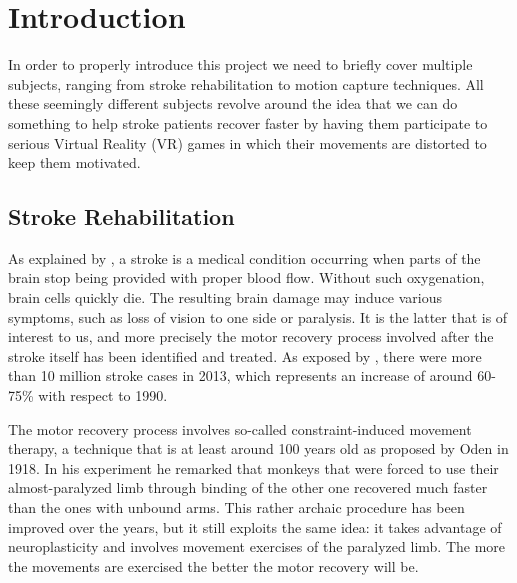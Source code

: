 
\chapter{Introduction} %

\label{Chapter1} %


In order to properly introduce this project we need to briefly cover multiple subjects, ranging from stroke rehabilitation to motion capture techniques. All these seemingly different subjects revolve around the idea that we can do something to help stroke patients recover faster by having them participate to serious Virtual Reality (VR) games in which their movements are distorted to keep them motivated.

\section{Stroke Rehabilitation}
As explained by \cite{nhlbi2017what}, a stroke is a medical condition occurring when parts of the brain stop being provided with proper blood flow. Without such oxygenation, brain cells quickly die. The resulting brain damage may induce various symptoms, such as loss of vision to one side or paralysis. It is the latter that is of interest to us, and more precisely the motor recovery process involved after the stroke itself has been identified and treated. As exposed by \cite{vos2015global}, there were more than 10 million stroke cases in 2013, which represents an increase of around 60-75\% with respect to 1990.

The motor recovery process involves so-called constraint-induced movement therapy, a technique that is at least around 100 years old as proposed by Oden \cite{oden1918systematic} in 1918. In his experiment he remarked that monkeys that were forced to use their almost-paralyzed limb through binding of the other one recovered much faster than the ones with unbound arms. This rather archaic procedure has been improved over the years, but it still exploits the same idea: it takes advantage of neuroplasticity and involves movement exercises of the paralyzed limb. The more the movements are exercised the better the motor recovery will be.

